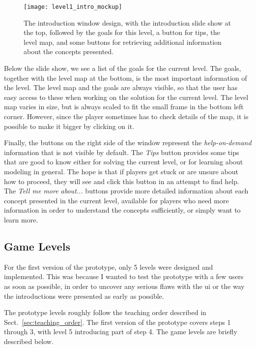 \begin{figure}[htp]
	\centering
	\texttt{[image: level1\_intro\_mockup]}
	\caption[Introduction window design]{The introduction window design, with the introduction slide show at the top, followed by the goals for this level, a button for tips, the level map, and some buttons for retrieving additional information about the concepts presented.}
	\label{fig:level1_intro_mockup}
\end{figure}

\noindent
Below the slide show, we see a list of the goals for the current level. The goals, together with the level map at the bottom, is the most important information of the level. The level map and the goals are always visible, so that the user has easy access to these when working on the solution for the current level. The level map varies in size, but is always scaled to fit the small frame in the bottom left corner. However, since the player sometimes has to check details of the map, it is possible to make it bigger by clicking on it.

\noindent
Finally, the buttons on the right side of the window represent the \emph{help-on-demand} information that is not visible by default. The \emph{Tips} button provides some tips that are good to know either for solving the current level, or for learning about modeling in general. The hope is that if players get stuck or are unsure about how to proceed, they will see and click this button in an attempt to find help. The \emph{Tell me more about...} buttons provide more detailed information about each concept presented in the current level, available for players who need more information in order to understand the concepts sufficiently, or simply want to learn more.

\subsection{Game Levels}
\label{sec:game_levels}
For the first version of the prototype, only 5 levels were designed and implemented. This was because I wanted to test the prototype with a few users as soon as possible, in order to uncover any serious flaws with the \gls{ui} or the way the introductions were presented as early as possible. 

\noindent
The prototype levels roughly follow the teaching order described in Sect.~\ref{sec:teaching_order}. The first version of the prototype covers steps 1 through 3, with level 5 introducing part of step 4. The game levels are briefly described below.

